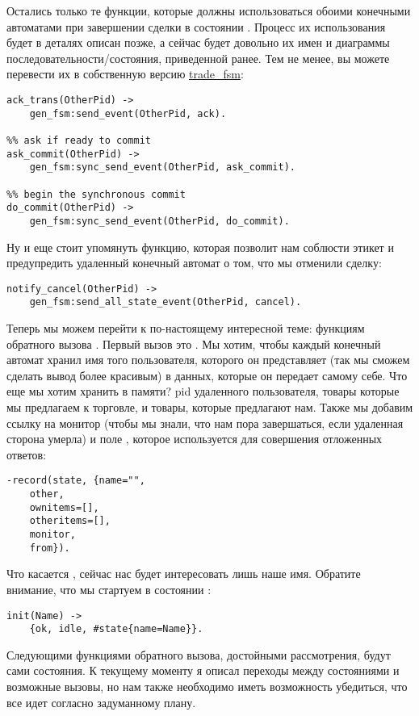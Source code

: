 Остались только те функции, которые должны использоваться обоими конечными автоматами при завершении сделки в состоянии .
Процесс их использования будет в деталях описан позже, а сейчас будет довольно их имен и диаграммы последовательности/состояния, приведенной ранее.
Тем не менее, вы можете перевести их в собственную версию \href{http://learnyousomeerlang.com/static/erlang/trade_fsm.erl}{trade\_fsm}:
\begin{lstlisting}[style=erlang]
%% Acknowledge that the fsm is in a ready state.
ack_trans(OtherPid) ->
	gen_fsm:send_event(OtherPid, ack).
 
%% ask if ready to commit
ask_commit(OtherPid) ->
	gen_fsm:sync_send_event(OtherPid, ask_commit).
 
%% begin the synchronous commit
do_commit(OtherPid) ->
	gen_fsm:sync_send_event(OtherPid, do_commit).
\end{lstlisting}
Ну и еще стоит упомянуть функцию, которая позволит нам соблюсти этикет и предупредить удаленный конечный автомат о том, что мы отменили сделку:
\begin{lstlisting}[style=erlang]
notify_cancel(OtherPid) ->
	gen_fsm:send_all_state_event(OtherPid, cancel).
\end{lstlisting}
Теперь мы можем перейти к по\--настоящему интересной теме: функциям обратного вызова .
Первый вызов это .
Мы хотим, чтобы каждый конечный автомат хранил имя того пользователя, которого он представляет (так мы сможем сделать вывод более красивым) в данных, которые он передает самому себе.
Что еще мы хотим хранить в памяти?
pid удаленного пользователя, товары которые мы предлагаем к торговле, и товары, которые предлагают нам.
Также мы добавим ссылку на монитор (чтобы мы знали, что нам пора завершаться, если удаленная сторона умерла) и поле , которое используется для совершения отложенных ответов:
\begin{lstlisting}[style=erlang]
-record(state, {name="",
	other,
	ownitems=[],
	otheritems=[],
	monitor,
	from}).
\end{lstlisting}
Что касается , сейчас нас будет интересовать лишь наше имя.
Обратите внимание, что мы стартуем в состоянии :
\begin{lstlisting}[style=erlang]
init(Name) ->
	{ok, idle, #state{name=Name}}.
\end{lstlisting}
Следующими функциями обратного вызова, достойными рассмотрения, будут сами состояния.
К текущему моменту я описал переходы между состояниями и возможные вызовы, но нам также необходимо иметь возможность убедиться, что все идет согласно задуманному плану.
